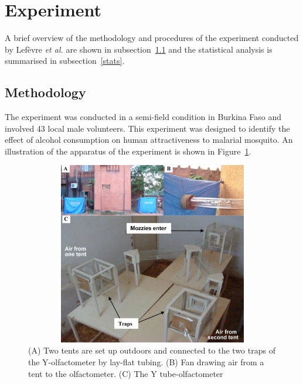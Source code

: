 \section{Experiment}\label{Experiment}
A brief overview of the methodology and procedures of the experiment conducted by Lef\`evre \textit{et al.} are shown in subsection~\ref{method} and the statistical analysis is summarised in subsection~\ref{stats}.

\subsection{Methodology}\label{method}
The experiment was conducted in a semi-field condition in Burkina Faso and involved 43 local male volunteers. This experiment was designed to identify the effect of alcohol consumption on human attractiveness to malarial mosquito. An illustration of the apparatus of the experiment is shown in Figure~\ref{aparatus}.
\begin{figure}[ht]
\centerline{\includegraphics[height=8cm,width=12cm]{./figures/aparatus}}
\caption{(A) Two tents are set up outdoors and connected to the two traps of the Y-olfactometer by lay-flat tubing. (B) Fan drawing air from a tent to the olfactometer. (C) The Y tube-olfactometer \label{aparatus}}
\end{figure}

